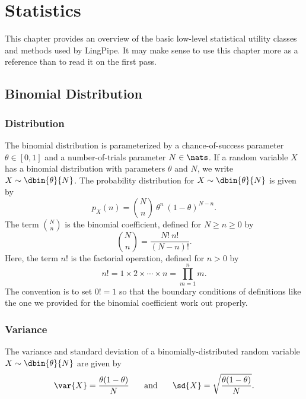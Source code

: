 \chapter{Statistics}\label{chapter:stats}

This chapter provides an overview of the basic low-level statistical
utility classes and methods used by LingPipe.  It may make sense to
use this chapter more as a reference than to read it on the first
pass.

\section{Binomial Distribution}

\subsection{Distribution}

The binomial distribution is parameterized by a chance-of-success
parameter $\theta \in [0,1]$ and a number-of-trials parameter $N \in
\nats$.  If a random variable $X$ has a binomial distribution with
parameters $\theta$ and $N$, we write $X \sim \dbin{\theta}{N}$.  The
probability distribution for $X \sim \dbin{\theta}{N}$ is given by 
%
\begin{equation}
p_X(n) = {N \choose n} \ \theta^{n} \ (1-\theta)^{N-n}.
\end{equation}
%
The term ${N \choose n}$ is the binomial coefficient, defined 
for $N \geq n \geq 0$ by
%
\begin{equation}
{N \choose n} = \frac{N! \ n!}{(N - n)!}.
\end{equation}
%
Here, the term $n!$ is the factorial operation, defined for $n > 0$ by
%
\begin{equation}
n! = 1 \times 2 \times \cdots \times n = \prod_{m=1}^n m.
\end{equation}
%
The convention is to set $0! = 1$ so that the boundary conditions of
definitions like the one we provided for the binomial coefficient work
out properly.

\subsection{Variance}\label{sect:stats-binomial-variance}

The variance and standard deviation of a binomially-distributed random
variable $X \sim \dbin{\theta}{N}$ are given by
%
\begin{equation}
\hfill
\var{X} = \frac{\theta (1 - \theta)}{N} 
\hspace*{0.25in}
\mbox{and}
\hspace*{0.25in}
\sd{X} = \sqrt{\frac{\theta (1 - \theta)}{N}}.
\hfill
\end{equation}
%

